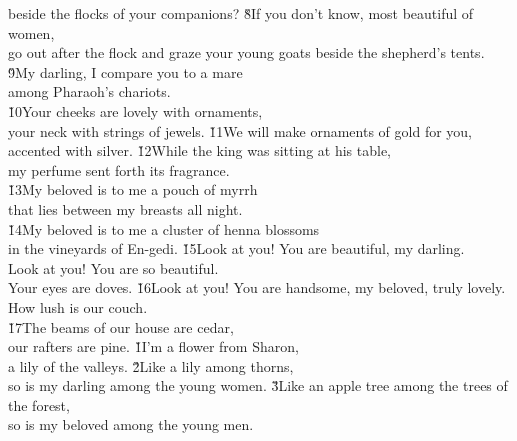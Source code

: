 \begin{poetry}
\poemll    beside the flocks of your companions?
\poeml \v{8}If you don't know, most beautiful of women, \\
\poemll    go out after the flock and graze your young goats beside the shepherd's tents. \\
\poeml \v{9}My darling, I compare you to a mare \\
\poemll    among Pharaoh's chariots. \\
\poeml \v{10}Your cheeks are lovely with ornaments, \\
\poemll    your neck with strings of jewels.
\poeml \v{11}We will make ornaments of gold for you, \\
\poemll    accented with silver.
\poeml \v{12}While the king was sitting at his table, \\
\poemll    my perfume sent forth its fragrance. \\
\poeml \v{13}My beloved is to me a pouch of myrrh \\
\poemll    that lies between my breasts all night. \\
\poeml \v{14}My beloved is to me a cluster of henna blossoms \\
\poemll    in the vineyards of En-gedi.
\poeml \v{15}Look at you! You are beautiful, my darling. \\
\poemll    Look at you! You are so beautiful. \\
\poemlll       Your eyes are doves.
\poeml \v{16}Look at you! You are handsome, my beloved, truly lovely. \\
\poemll    How lush is our couch. \\
\poeml \v{17}The beams of our house are cedar, \\
\poemll    our rafters are pine.
\poeml {}
\v{1}I'm a flower from Sharon, \\
\poeml a lily of the valleys.
\poeml \v{2}Like a lily among thorns, \\
\poemll    so is my darling among the young women.
\poeml \v{3}Like an apple tree among the trees of the forest, \\
\poemll    so is my beloved among the young men. \\

\end{poetry}
